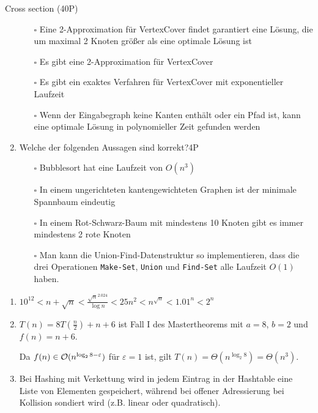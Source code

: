 \documentclass{article}
\begin{document}
\begin{exercise}{Cross section (40P)}
\begin{enumerate}
          \begin{itemize}
            \item[$\square$] Eine 2-Approximation für VertexCover findet garantiert eine Lösung, die um maximal 2 Knoten größer als eine optimale Lösung ist
            \item[$\square$] Es gibt eine 2-Approximation für VertexCover
            \item[$\square$] Es gibt ein exaktes Verfahren für VertexCover mit exponentieller Laufzeit
            \item[$\square$] Wenn der Eingabegraph keine Kanten enthält oder ein Pfad ist, kann eine optimale Lösung in polynomieller Zeit gefunden werden
          \end{itemize}
    \item Welche der folgenden Aussagen sind korrekt?\hfill 4P
          \begin{itemize}
            \item[$\square$] Bubblesort hat eine Laufzeit von $O(n^3)$
            \item[$\square$] In einem ungerichteten kantengewichteten Graphen ist der minimale Spannbaum eindeutig
            \item[$\square$] In einem Rot-Schwarz-Baum mit mindestens 10 Knoten gibt es immer mindestens 2 rote Knoten
            \item[$\square$] Man kann die Union-Find-Datenstruktur so implementieren, dass die drei Operationen \texttt{Make-Set}, \texttt{Union} und \texttt{Find-Set} alle Laufzeit $O(1)$ haben.
          \end{itemize}
  \end{enumerate}
  \begin{solution}
    \begin{enumerate}
      \item $10^{12} < n + \sqrt{n} < \frac{\sqrt{n}^{2.024}}{\log n} < 25n^2 < n^{\sqrt{n}} < {1.01}^n < 2^n$
      \item $T(n) = 8T\left(\frac{n}{2}\right) + n +6$ ist Fall I des Mastertheorems mit $a = 8$, $b = 2$ und $f(n) = n + 6$.\par
            Da $f(n) \in \mathcal{O}(n^{\log_2 8 - \varepsilon})$ für $\varepsilon = 1$ ist, gilt $T(n) = \Theta(n^{\log_2 8}) = \Theta(n^3)$.
      \item Bei Hashing mit Verkettung wird in jedem Eintrag in der Hashtable eine Liste von Elementen gespeichert, während bei offener Adressierung bei Kollision sondiert wird (z.B. linear oder quadratisch).

\end{enumerate}
\end{solution}
\end{exercise}
\end{document}
